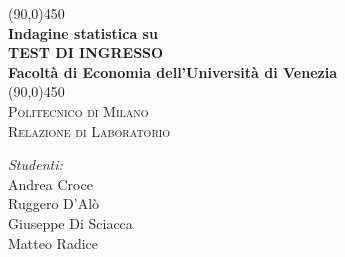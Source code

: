 \documentclass[titlepage,a4paper,11pt]{article}
\begin{document}
\begin{titlepage}
\begin{center}
\linethickness{0.15cm}
\line(90,0){450}\\[0.5cm]
{\huge \bfseries Indagine statistica su} \\[0.2cm]
{\huge \bfseries TEST DI INGRESSO } \\[0.2cm]
{\Large \bfseries Facoltà di Economia dell’Università di Venezia} \\[0.2cm]
\linethickness{0.11cm}
\line(90,0){450}\\[1.0cm]
\textsc{\LARGE Politecnico di Milano}\\[1.2cm]
\textsc{\Large Relazione di Laboratorio}\\[1.0cm]
\end{center}
\begin{minipage}{0.8\textwidth}
\begin{flushright} \large
\emph{Studenti:}\\
  Andrea Croce \\
  Ruggero D'Alò \\
  Giuseppe Di Sciacca \\
  Matteo Radice \\
\end{flushright}
\end{minipage}
\end{titlepage}
\graphicspath{{../Immagini/}}










\clearpage
\tableofcontents
\listoffigures
\end{document}
